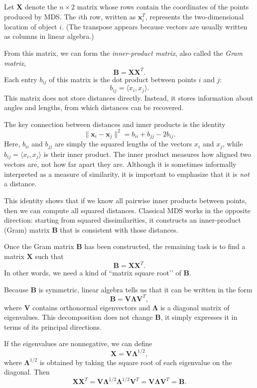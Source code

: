 \medskip

Let $\mathbf{X}$ denote the $n \times 2$ matrix whose rows contain the coordinates
of the points produced by MDS. The $i$th row, written as $\mathbf{x}_i^T$, represents
the two-dimensional location of object $i$. (The transpose appears because vectors
are usually written as columns in linear algebra.)

From this matrix, we can form the \emph{inner-product matrix}, also called the
\emph{Gram matrix},
\[
\mathbf{B} = \mathbf{X}\mathbf{X}^T.
\]
Each entry $b_{ij}$ of this matrix is the dot product between points $i$ and $j$:
\[
b_{ij} = \langle x_i, x_j \rangle.
\]
This matrix does not store distances directly. Instead, it stores information about
angles and lengths, from which distances can be recovered.

\medskip

The key connection between distances and inner products is the identity
\[
\|\mathbf{x}_i - \mathbf{x}_j\|^2
= b_{ii} + b_{jj} - 2b_{ij}.
\]
Here, $b_{ii}$ and $b_{jj}$ are simply the squared lengths of the vectors
$x_i$ and $x_j$, while $b_{ij} = \langle x_i, x_j \rangle$ is their inner product.
The inner product measures how aligned two vectors are, not how far apart they are.
Although it is sometimes informally interpreted as a measure of similarity,
it is important to emphasize that it is \emph{not} a distance.

This identity shows that if we know all pairwise inner products between points,
then we can compute all squared distances. Classical MDS works in the opposite
direction: starting from squared dissimilarities, it constructs an inner-product
(Gram) matrix $\mathbf{B}$ that is consistent with those distances.

\medskip

Once the Gram matrix $\mathbf{B}$ has been constructed, the remaining task
is to find a matrix $\mathbf{X}$ such that
\[
\mathbf{B} = \mathbf{X}\mathbf{X}^T.
\]
In other words, we need a kind of “matrix square root’’ of $\mathbf{B}$.

Because $\mathbf{B}$ is symmetric, linear algebra tells us that it can be
written in the form
\[
\mathbf{B} = \mathbf{V}\mathbf{\Lambda}\mathbf{V}^T,
\]
where $\mathbf{V}$ contains orthonormal eigenvectors and
$\mathbf{\Lambda}$ is a diagonal matrix of eigenvalues.
This decomposition does not change $\mathbf{B}$, it simply expresses it
in terms of its principal directions.

If the eigenvalues are nonnegative, we can define
\[
\mathbf{X} = \mathbf{V}\mathbf{\Lambda}^{1/2},
\]
where $\mathbf{\Lambda}^{1/2}$ is obtained by taking the square root of
each eigenvalue on the diagonal.
Then
\[
\mathbf{X}\mathbf{X}^T
=
\mathbf{V}\mathbf{\Lambda}^{1/2}
\mathbf{\Lambda}^{1/2}\mathbf{V}^T
=
\mathbf{V}\mathbf{\Lambda}\mathbf{V}^T
=
\mathbf{B}.
\]

